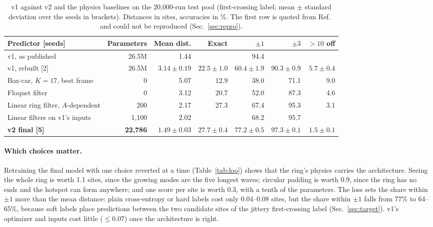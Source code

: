 \documentclass[11pt]{article}
\begin{document}
\begin{table}[htbp]
  \centering
  \caption{v1 against v2 and the physics baselines on the 20,000-run test pool (first-crossing label; mean $\pm$ standard deviation over the seeds in brackets). Distances in sites, accuracies in \%. The first row is quoted from Ref.~\cite{mittal2026jand} and could not be reproduced (Sec.~\ref{sec:repro}).}
  \label{tab:headline}
  \small
  \setlength{\tabcolsep}{4pt}
  \begin{tabular}{@{}lrrrrrr@{}}
    \toprule
    Predictor [seeds] & Parameters & Mean dist. & Exact & $\pm1$ & $\pm3$ & $>10$ off \\
    \midrule
    v1, as published \cite{mittal2026jand} & 26.5M & 1.44 & & 94.4 & & \\
    v1, rebuilt [2] & 26.5M & $3.14\pm0.19$ & $22.5\pm1.0$ & $60.4\pm1.9$ & $90.3\pm0.9$ & $5.7\pm0.4$ \\
    Box-car, $K=17$, best frame & 0 & 5.07 & 12.9 & 38.0 & 71.1 & 9.0 \\
    Floquet filter & 0 & 3.12 & 20.7 & 52.0 & 87.3 & 4.6 \\
    Linear ring filter, $A$-dependent & 200 & 2.17 & 27.3 & 67.4 & 95.3 & 3.1 \\
    Linear filters on v1's inputs & 1,100 & 2.02 & & 68.2 & 95.7 & \\
    \textbf{v2 final [5]} & \textbf{22,786} & $\mathbf{1.49\pm0.03}$ & $\mathbf{27.7\pm0.4}$ & $\mathbf{77.2\pm0.5}$ & $\mathbf{97.3\pm0.1}$ & $\mathbf{1.5\pm0.1}$ \\
    \bottomrule
  \end{tabular}
\end{table}

\paragraph{Which choices matter.} Retraining the final model with one choice reverted at a time (Table~\ref{tab:loo}) shows that the ring's physics carries the architecture. Seeing the whole ring is worth 1.1 sites, since the growing modes are the five longest waves; circular padding is worth 0.9, since the ring has no ends and the hotspot can form anywhere; and one score per site is worth 0.3, with a tenth of the parameters. The loss sets the share within $\pm1$ more than the mean distance: plain cross-entropy or hard labels cost only 0.04--0.08 sites, but the share within $\pm1$ falls from 77\% to 64--65\%, because soft labels place predictions between the two candidate sites of the jittery first-crossing label (Sec.~\ref{sec:target}). v1's optimizer and inputs cost little ($\le0.07$) once the architecture is right.
\end{document}
